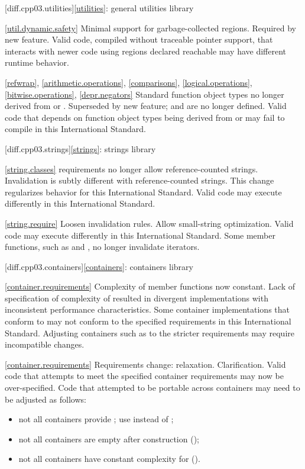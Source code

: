 [diff.cpp03.utilities]{\ref{utilities}: general utilities library}

\ref{util.dynamic.safety}
\change Minimal support for garbage-collected regions.
\rationale Required by new feature.
\effect
Valid \CppIII code, compiled without traceable pointer support,
that interacts with newer \Cpp code using regions declared reachable may
have different runtime behavior.

\ref{refwrap}, \ref{arithmetic.operations}, \ref{comparisons},
\ref{logical.operations}, \ref{bitwise.operations}, \ref{depr.negators}
\change Standard function object types no longer derived from
 or .
\rationale Superseded by new feature;  and
 are no longer defined.
\effect
Valid \CppIII code that depends on function object types being derived from
 or  may fail to compile
in this International Standard.

[diff.cpp03.strings]{\ref{strings}: strings library}

\ref{string.classes}
\change {} requirements no longer allow reference-counted
strings.
\rationale Invalidation is subtly different with reference-counted strings.
This change regularizes behavior for this International Standard.
\effect
Valid \CppIII code may execute differently in this International Standard.

\ref{string.require}
\change Loosen  invalidation rules.
\rationale Allow small-string optimization.
\effect
Valid \CppIII code may execute differently in this International Standard.
Some  member functions, such as  and ,
no longer invalidate iterators.

[diff.cpp03.containers]{\ref{containers}: containers library}

\ref{container.requirements}
\change Complexity of  member functions now constant.
\rationale Lack of specification of complexity of  resulted in
divergent implementations with inconsistent performance characteristics.
\effect
Some container implementations that conform to \CppIII may not conform to the
specified  requirements in this International Standard. Adjusting
containers such as  to the stricter requirements may require
incompatible changes.

\ref{container.requirements}
\change Requirements change: relaxation.
\rationale Clarification.
\effect
Valid \CppIII code that attempts to meet the specified container requirements
may now be over-specified. Code that attempted to be portable across containers
may need to be adjusted as follows:
\begin{itemize}
\item not all containers provide ; use  instead
of ;
\item not all containers are empty after construction ();
\item not all containers have constant complexity for  ().
\end{itemize}

